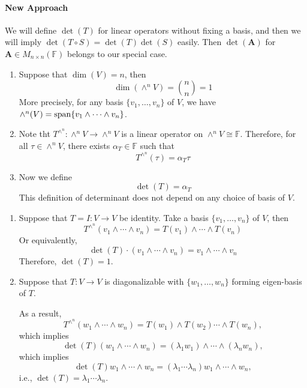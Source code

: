 \paragraph{New Approach}
We will define $\det(T)$ for linear operators without fixing a basis,
and then we will imply $\det(T\circ S) = \det(T)\det(S)$ easily.
Then $\det(\bm A)$ for $\bm A\in M_{n\times n}(\mathbb{F})$ belongs to our special case.

\begin{definition}
\begin{enumerate}
\item
Suppose that $\dim(V)=n$, then
\[
\dim(\wedge^nV)=\binom{n}{n}=1
\]
More precisely, for any basis $\{v_1,\dots,v_n\}$ of $V$, we have $\wedge^n(V)=\operatorname{span}\{v_1\wedge\dots\wedge v_n\}$.
\item
Note tht $T^{\wedge^n}:\wedge^nV\to \wedge^nV$
is a linear operator on $\wedge^nV\cong\mathbb{F}$.
Therefore, for all $\tau\in \wedge^nV$, there exists $\alpha_{T}\in\mathbb{F}$ such that
\[
T^{\wedge^n}(\tau) = \alpha_{T}\tau
\]
\item
Now we define
\[
\det(T) = \alpha_{T}
\]
This definition of determinant does not depend on any choice of basis of $V$.
\end{enumerate}
\end{definition}




\begin{example}\label{exp:15:1}
\begin{enumerate}
\item
Suppose that $T=I:V\to V$ be identity.
Take a basis $\{v_1,\dots,v_n\}$ of $V$, then
\[
T^{\wedge^n} (v_1\wedge\cdots\wedge v_n)
=
T(v_1)\wedge\cdots\wedge T(v_n)
\]
Or equivalently,
\[
\det(T)\cdot (v_1\wedge\cdots\wedge v_n) = v_1\wedge\cdots\wedge v_n
\]
Therefore, $\det(T)=1$.
\item
Suppose that $T:V\to V$ is diagonalizable with
$\{w_1,\dots,w_n\}$ forming eigen-basis of $T$.

As a result,
\[
T^{\wedge^n}(w_1\wedge\cdots\wedge w_n)
=
T(w_1)\wedge T(w_2)\cdots\wedge T(w_n),
\]
which implies
\[
\det(T)(w_1\wedge\cdots\wedge w_n)
=
(\lambda_1w_1)\wedge\cdots\wedge(\lambda_nw_n),
\]
which implies
\[
\det(T)w_1\wedge\cdots\wedge w_n=(\lambda_1\cdots\lambda_n)w_1\wedge\cdots\wedge w_n,
\]
i.e., $\det(T)=\lambda_1\cdots\lambda_n$.
\end{enumerate}
\end{example}



